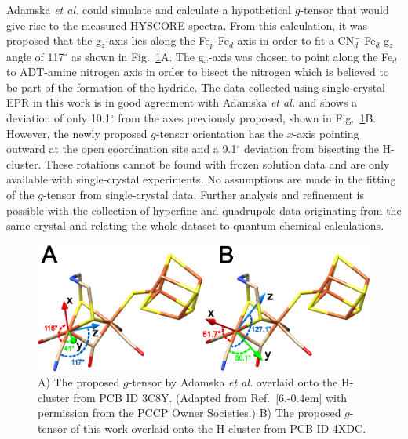 Adamska {\em et al.} could simulate and calculate a hypothetical $g$-tensor that would give rise to the measured HYSCORE spectra. From this calculation, it was proposed that the g$_z$-axis lies along the Fe$_p$-Fe$_d$ axis in order to fit a CN$_d^-$-Fe$_d$-g$_z$ angle of 117$^\circ$ as shown in Fig.~\ref{fig:gTensor}A. The g$_x$-axis was chosen to point along the Fe$_d$ to ADT-amine nitrogen axis in order to bisect the nitrogen which is believed to be part of the formation of the hydride. The data collected using single-crystal EPR in this work is in good agreement with Adamska {\em et al.} and shows a deviation of only 10.1$^{\circ}$ from the axes previously proposed, shown in Fig.~\ref{fig:gTensor}B. However, the newly proposed $g$-tensor orientation has the $x$-axis pointing outward at the open coordination site and a 9.1$^{\circ}$ deviation from bisecting the H-cluster. These rotations cannot be found with frozen solution data and are only available with single-crystal experiments. No assumptions are made in the fitting of the $g$-tensor from single-crystal data. Further analysis and refinement is possible with the collection of hyperfine and quadrupole data originating from the same crystal and relating the whole dataset to quantum chemical calculations.

\begin{figure}[ht]
\centering
\includegraphics{Kapitel/Appendix/Images/S6-gTensorCompare.eps}
\caption[Comparison of the proposed $g$-tensor.]{A) The proposed $g$-tensor by Adamska {\em et al.} overlaid onto the H-cluster from PCB ID 3C8Y. (Adapted from Ref.~[6.\kern-0.4em] with permission from the PCCP Owner Societies.) B) The proposed $g$-tensor of this work overlaid onto the H-cluster from PCB ID 4XDC.}
\label{fig:gTensor}
\end{figure}

